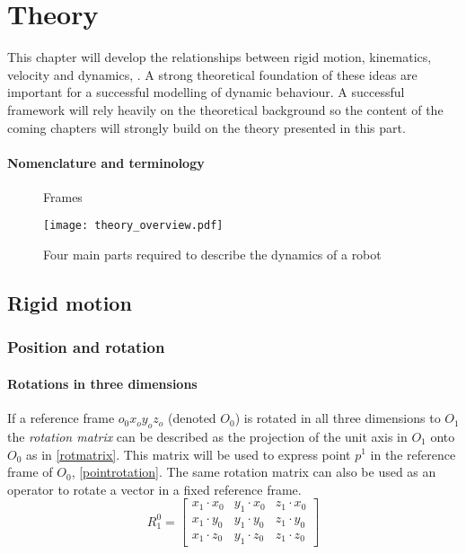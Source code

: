 \chapter{Theory}
This chapter will develop the relationships between rigid motion, kinematics, velocity and dynamics, . A strong theoretical foundation of these ideas are important for a successful modelling of dynamic behaviour. A successful framework will rely heavily on the theoretical background so the content of the coming chapters will strongly build on the theory presented in this part.

\subsubsection{Nomenclature and terminology}


\begin{figure}[h!]    
    \centering           
    \def\svgwidth{.8\columnwidth}
    
    \caption{Frames}
\end{figure}

\begin{figure}
 \centering 
 \texttt{[image: theory\_overview.pdf]}
 \caption{Four main parts required to describe the dynamics of a robot}
 \label{theory_overview}
\end{figure}

\section{Rigid motion}
\subsection{Position and rotation}
\subsubsection{Rotations in three dimensions}

If a reference frame $o_0 x_o y_o z_o$ (denoted $O_0$) is rotated in all three dimensions to $O_1$ the \textit{rotation matrix} can be described as the projection of the unit axis in $O_1$ onto $O_0$ as in \eqref{rotmatrix}. This matrix will be used to express point $p^1$ in the reference frame of $O_0$, \eqref{pointrotation}. The same rotation matrix can also be used as an operator to rotate a vector in a fixed reference frame.
\begin{equation}\label{rotmatrix}
R^0_1=\begin{bmatrix}
x_1\cdot x_0 & y_1\cdot x_0 & z_1\cdot x_0\\ 
x_1\cdot y_0 & y_1\cdot y_0 & z_1\cdot y_0\\ 
x_1\cdot z_0 & y_1\cdot z_0 & z_1\cdot z_0
\end{bmatrix}
\end{equation}

